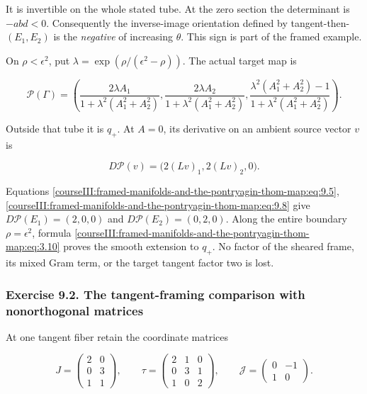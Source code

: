 It is invertible on the whole stated tube. At the zero section the determinant is \(-abd<0\). Consequently the inverse-image orientation defined by tangent-then-\((E_1,E_2)\) is the \emph{negative} of increasing \(\theta\). This sign is part of the framed example.

On \(\rho<\epsilon^2\), put
\(\lambda=\exp(\rho/(\epsilon^2-\rho))\). The actual target map is

\begin{equation}
\mathcal P(\Gamma)=
 \left(
 \frac{2\lambda A_1}{1+\lambda^2(A_1^2+A_2^2)},
 \frac{2\lambda A_2}{1+\lambda^2(A_1^2+A_2^2)},
 \frac{\lambda^2(A_1^2+A_2^2)-1}
      {1+\lambda^2(A_1^2+A_2^2)}
 \right).
 \label{courseIII:framed-manifolds-and-the-pontryagin-thom-map:eq:9.7}
\end{equation}

Outside that tube it is \(q_+\). At \(A=0\), its derivative on an ambient source vector \(v\) is

\begin{equation}
D\mathcal P(v)=\bigl(2(Lv)_1,2(Lv)_2,0\bigr).
 \label{courseIII:framed-manifolds-and-the-pontryagin-thom-map:eq:9.8}
\end{equation}

Equations \eqref{courseIII:framed-manifolds-and-the-pontryagin-thom-map:eq:9.5}, \eqref{courseIII:framed-manifolds-and-the-pontryagin-thom-map:eq:9.8} give \(D\mathcal P(E_1)=(2,0,0)\) and \(D\mathcal P(E_2)=(0,2,0)\). Along the entire boundary \(\rho=\epsilon^2\), formula \eqref{courseIII:framed-manifolds-and-the-pontryagin-thom-map:eq:3.10} proves the smooth extension to \(q_+\). No factor of the sheared frame, its mixed Gram term, or the target tangent factor two is lost.

\subsubsection{Exercise 9.2. The tangent-framing comparison with nonorthogonal matrices}
\label{courseIII:framed-manifolds-and-the-pontryagin-thom-map:exercise-9.2}

\label{courseIII:pontryagin-thom:9.2}

At one tangent fiber retain the coordinate matrices

\begin{equation}
J=\begin{pmatrix}2&0\\0&3\\1&1\end{pmatrix},\qquad
 \tau=\begin{pmatrix}2&1&0\\0&3&1\\1&0&2\end{pmatrix},
 \qquad
 \mathcal J=\begin{pmatrix}0&-1\\1&0\end{pmatrix}.
 \label{courseIII:framed-manifolds-and-the-pontryagin-thom-map:eq:9.9}
\end{equation}

